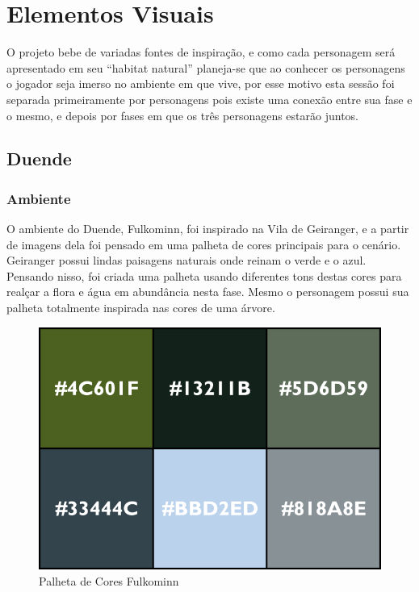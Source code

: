 
\section{Elementos Visuais}
O projeto bebe de variadas fontes de inspiração, e como cada personagem será apresentado em seu ``habitat natural'' planeja-se que ao conhecer os personagens o jogador seja imerso no ambiente em que vive, por esse motivo esta sessão foi separada primeiramente por personagens pois existe uma conexão entre sua fase e o mesmo, e depois por fases em que os três personagens estarão juntos.

\subsection{Duende}
\subsubsection{Ambiente}
O ambiente do Duende, Fulkominn, foi inspirado na Vila de Geiranger, e a partir de imagens dela foi pensado em uma palheta de cores principais para o cenário. Geiranger possui lindas paisagens naturais onde reinam o verde e o azul. Pensando nisso, foi criada uma palheta usando diferentes tons destas cores para realçar a flora e água em abundância nesta fase. Mesmo o personagem possui sua palheta totalmente inspirada nas cores de uma árvore.

\begin{figure}[htb]
	\caption{\label{fig_palhetaFulkominn}Palheta de Cores Fulkominn}
	\begin{center}
	    \includegraphics[width=\textwidth/2]{imagens/PaletaGeiranger.png}
	\end{center}
\end{figure}

